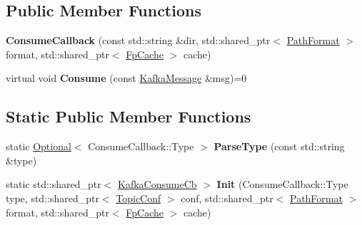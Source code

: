 \subsection*{Public Member Functions}
\begin{DoxyCompactItemize}
\item 
{\bfseries Consume\+Callback} (const std\+::string \&dir, std\+::shared\+\_\+ptr$<$ \hyperlink{classlog2hdfs_1_1PathFormat}{Path\+Format} $>$ format, std\+::shared\+\_\+ptr$<$ \hyperlink{classlog2hdfs_1_1FpCache}{Fp\+Cache} $>$ cache)\hypertarget{classlog2hdfs_1_1ConsumeCallback_a695f997b812b87b894283a395d700b6e}{}\label{classlog2hdfs_1_1ConsumeCallback_a695f997b812b87b894283a395d700b6e}

\item 
virtual void {\bfseries Consume} (const \hyperlink{classlog2hdfs_1_1KafkaMessage}{Kafka\+Message} \&msg)=0\hypertarget{classlog2hdfs_1_1ConsumeCallback_a873d0d1a6945dba9730d987907ad85e8}{}\label{classlog2hdfs_1_1ConsumeCallback_a873d0d1a6945dba9730d987907ad85e8}

\end{DoxyCompactItemize}
\subsection*{Static Public Member Functions}
\begin{DoxyCompactItemize}
\item 
static \hyperlink{classlog2hdfs_1_1Optional}{Optional}$<$ Consume\+Callback\+::\+Type $>$ {\bfseries Parse\+Type} (const std\+::string \&type)\hypertarget{classlog2hdfs_1_1ConsumeCallback_ae84b446c67424aad2a4a9bf0bb889cd1}{}\label{classlog2hdfs_1_1ConsumeCallback_ae84b446c67424aad2a4a9bf0bb889cd1}

\item 
static std\+::shared\+\_\+ptr$<$ \hyperlink{classlog2hdfs_1_1KafkaConsumeCb}{Kafka\+Consume\+Cb} $>$ {\bfseries Init} (Consume\+Callback\+::\+Type type, std\+::shared\+\_\+ptr$<$ \hyperlink{classlog2hdfs_1_1TopicConf}{Topic\+Conf} $>$ conf, std\+::shared\+\_\+ptr$<$ \hyperlink{classlog2hdfs_1_1PathFormat}{Path\+Format} $>$ format, std\+::shared\+\_\+ptr$<$ \hyperlink{classlog2hdfs_1_1FpCache}{Fp\+Cache} $>$ cache)\hypertarget{classlog2hdfs_1_1ConsumeCallback_a850e946e425e5c1f8036722a28a68f7f}{}\label{classlog2hdfs_1_1ConsumeCallback_a850e946e425e5c1f8036722a28a68f7f}

\end{DoxyCompactItemize}
